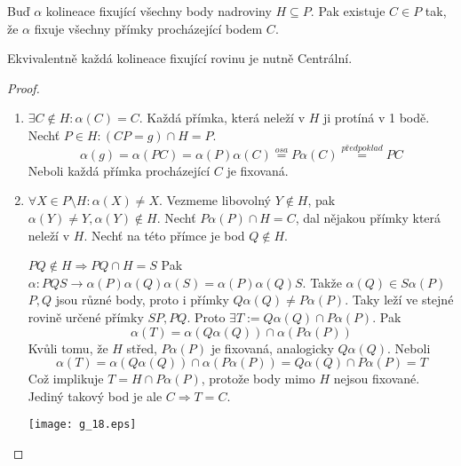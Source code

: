 \begin{lemma}\label{kpp:kolin_centr_kolin}
    Buď $\alpha$ kolineace fixující všechny body nadroviny $H\subseteq P$.
    Pak existuje $C\in P$ tak, že $\alpha$ fixuje  všechny přímky procházející bodem $C$.

    Ekvivalentně každá kolineace fixující rovinu je nutně Centrální.
\end{lemma}
\begin{proof}~
    \begin{enumerate}
	    \item $ \exists C \notin H: \alpha(C) = C$.
		    Každá přímka, která neleží v $H$ ji protíná v 1 bodě.
		    Nechť $P \in H: (CP = g) \cap H = P$.
		    \[ \alpha(g) = \alpha(PC) = \alpha(P)\alpha(C) \stackrel{osa}{=} P\alpha(C) \stackrel{předpoklad}{=} PC \]
		    Neboli každá přímka procházející $C$ je fixovaná.
	    \item $ \forall X \in P \setminus H: \alpha(X) \ne X$.
		    Vezmeme libovolný $Y \notin H$, pak $\alpha(Y) \ne Y, \alpha(Y) \notin H$.
		    Nechť $P\alpha(P) \cap H = C$, dal nějakou přímky která neleží v $H$.
		    Nechť na této přímce je bod $Q \notin H$.

		    $PQ \notin H \Rightarrow PQ \cap H = S$
		    Pak $\alpha: PQS \to \alpha(P) \alpha(Q) \alpha(S) = \alpha(P) \alpha(Q) S$.
		    Takže $\alpha(Q) \in S \alpha(P)$
		    $P, Q$ jsou různé body, proto i přímky $Q\alpha(Q) \ne P\alpha(P)$.
		    Taky leží ve stejné rovině určené přímky $SP, PQ$.
		    Proto $\exists T:= Q\alpha(Q) \cap P\alpha(P)$.
		    Pak
		    \[ \alpha(T) = \alpha(Q\alpha(Q)) \cap \alpha(P\alpha(P)) \]
		    Kvůli tomu, že $H$ střed, $P\alpha(P)$ je fixovaná, analogicky $Q\alpha(Q)$.
		    Neboli
		    \[ \alpha(T) = \alpha(Q\alpha(Q)) \cap \alpha(P\alpha(P)) = Q\alpha(Q) \cap P\alpha(P) = T \]
		    Což implikuje $T = H \cap P\alpha(P)$, protože body mimo $H$ nejsou fixované.
		    Jediný takový bod je ale $C \Rightarrow T = C$.

    	\texttt{[image: g\_18.eps]}
    \end{enumerate}
\end{proof}

